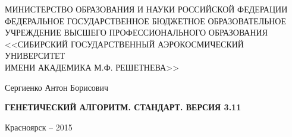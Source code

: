 \thispagestyle{empty}

\begin{center}
\MakeUppercase{Министерство образования и науки Российской Федерации} \\ 
\MakeUppercase{федеральное государственное бюджетное образовательное} \\
\MakeUppercase{учреждение высшего профессионального образования } \\
\MakeUppercase{<<Сибирский государственный аэрокосмический университет} \\
\MakeUppercase{имени академика М.Ф. Решетнева>>}
\end{center}

\vspace{20mm}

\vspace{30mm}
\begin{center}
{\large Сергиенко Антон Борисович}
\end{center}

\vspace{5mm}
\begin{center}
{\bf \large \MakeUppercase{Генетический алгоритм. Стандарт. Версия 3.11}
\par}

\vspace{10mm}

\vspace{10mm}

\end{center}

\vspace{80mm}

\vspace{20mm}
\begin{center}
{Красноярск -- 2015}
\end{center}

\newpage